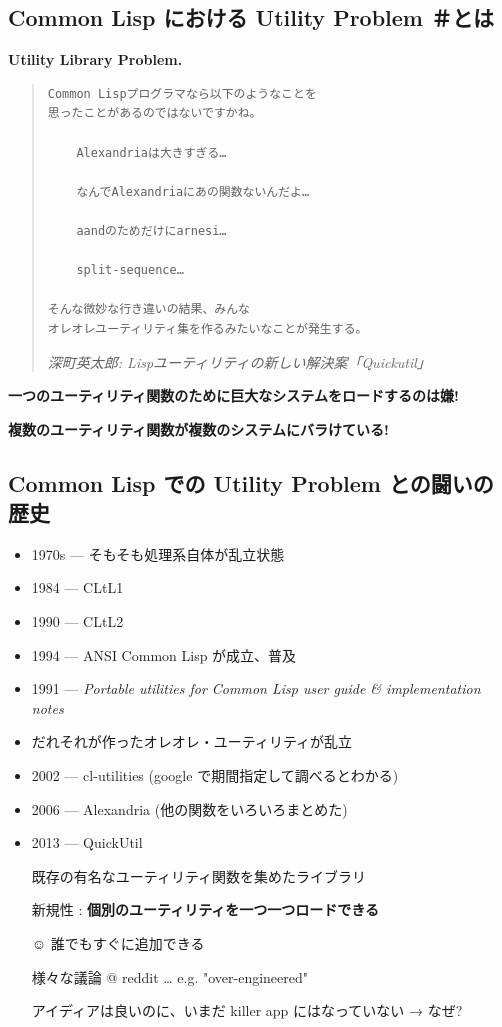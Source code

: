 \subsection{Common Lisp における Utility Problem ＃とは}
\label{sec-2-5}

\begin{larger}
\textbf{Utility Library Problem.}
\end{larger}



\begin{quote}
\begin{verbatim}
Common Lispプログラマなら以下のようなことを
思ったことがあるのではないですかね。

    Alexandriaは大きすぎる…

    なんでAlexandriaにあの関数ないんだよ…

    aandのためだけにarnesi…

    split-sequence…

そんな微妙な行き違いの結果、みんな
オレオレユーティリティ集を作るみたいなことが発生する。
\end{verbatim}
\begin{alignright}
\emph{深町英太郎: Lispユーティリティの新しい解決案「Quickutil」}
\end{alignright}
\end{quote}

\textbf{一つのユーティリティ関数のために巨大なシステムをロードするのは嫌!}

\textbf{複数のユーティリティ関数が複数のシステムにバラけている!}

\subsection{Common Lisp での Utility Problem との闘いの歴史}
\label{sec-2-6}

\begin{itemize}
\item 1970s --- そもそも処理系自体が乱立状態
\item 1984 --- CLtL1
\item 1990 --- CLtL2
\item 1994 --- ANSI Common Lisp が成立、普及
\item 1991 --- \emph{Portable utilities for Common Lisp user guide \& implementation notes}
\item だれそれが作ったオレオレ・ユーティリティが乱立
\item 2002 --- cl-utilities (google で期間指定して調べるとわかる)
\item 2006 --- Alexandria (他の関数をいろいろまとめた)
\item 2013 --- QuickUtil

既存の有名なユーティリティ関数を集めたライブラリ

新規性 : \textbf{個別のユーティリティを一つ一つロードできる}

☺ 誰でもすぐに追加できる

様々な議論 @ reddit \ldots{} e.g. "over-engineered"

アイディアは良いのに、いまだ killer app にはなっていない → なぜ?
\end{itemize}


